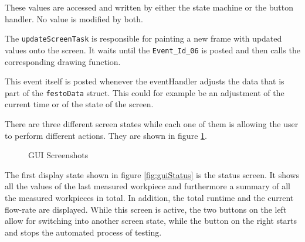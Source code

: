 These values are accessed and written by either the state machine or the button handler. No value is modified by both. 


The \texttt{updateScreenTask} is responsible for painting a new frame with updated values onto the screen.
It waits until the \texttt{Event\_Id\_06} is posted and then calls the corresponding drawing function.

This event itself is posted whenever the eventHandler adjusts the data that is part of the \texttt{festoData} struct.
This could for example be an adjustment of the current time or of the state of the screen.

There are three different screen states while each one of them is allowing the user to perform different actions. They are shown in figure \ref{fig:gui}.

\begin{figure} [H] 	
	\begin{center}
		\quad
		\quad
		\caption{GUI Screenshots}
		\label{fig:gui}
	\end{center}
\end{figure} 

The first display state shown in figure \ref{fig:guiStatus} is the status screen.
It shows all the values of the last measured workpiece and furthermore a summary of all the measured workpieces in total.
In addition, the total runtime and the current flow-rate are displayed.
While this screen is active, the two buttons on the left allow for switching into another screen state, while the button on the right starts and stops the automated process of testing.

